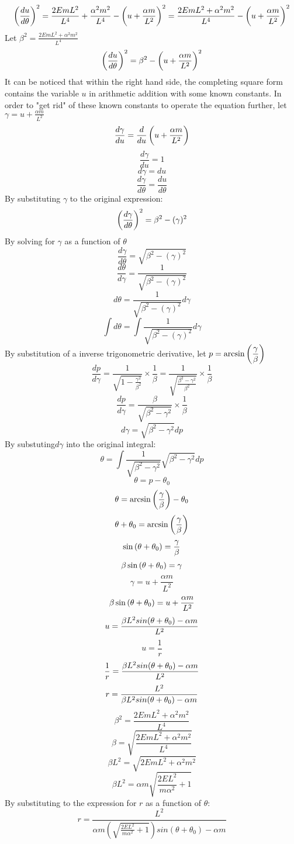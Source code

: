 \documentclass[a4paper, 12pt]{report}
\begin{document}
\begin{center}
$$\left(\frac{du}{d\theta}\right)^2=\frac{2EmL^2}{L^4}+ \frac{\alpha^2 m^2}{L^4}-\left(u+\frac{\alpha m}{L^2}\right)^2 = \frac{2EmL^2+\alpha^2 m^2}{L^4}-\left(u+\frac{\alpha m}{L^2}\right)^2$$
Let $\displaystyle \beta^2 = \frac{2EmL^2+\alpha^2 m^2}{L^4}$
$$\left(\frac{du}{d\theta}\right)^2=\beta^2-\left(u+\frac{\alpha m}{L^2}\right)^2$$
It can be noticed that within the right hand side, the completing square form contains the variable $u$ in arithmetic addition with some known constants. In order to "get rid" of these known constants to operate the equation further, let $\displaystyle \gamma = u +\frac{\alpha m}{L^2}$
$$\frac{d\gamma}{du} = \frac{d}{du}\left(u+\frac{\alpha m}{L^2}\right)$$
$$\frac{d\gamma}{du} = 1$$
$$d\gamma = du$$
$$\frac{d\gamma}{d\theta}=\frac{du}{d\theta}$$
By substituting $\gamma$ to the original expression:
$$\left(\frac{d\gamma}{d\theta}\right)^2 = \beta^2-(\gamma)^2$$
By solving for $\gamma$ as a function of $\theta$
$$\frac{d\gamma}{d\theta} = \sqrt{\beta^2-(\gamma)^2}$$
$$\frac{d\theta}{d\gamma} = \frac{1}{\sqrt{\beta^2-(\gamma)^2}}$$
$$d\theta= \frac{1}{\sqrt{\beta^2-(\gamma)^2}}d\gamma$$
$$\int{d\theta} = \int{\frac{1}{\sqrt{\beta^2-(\gamma)^2}}d\gamma}$$
By substitution of a inverse trigonometric derivative, let $\displaystyle p = \arcsin\left(\frac{\gamma}{\beta}\right)$
$$\frac{dp}{d\gamma} = \frac{1}{\sqrt{1-\frac{\gamma^2}{\beta^2}}}\times\frac{1}{\beta} = \frac{1}{\sqrt{\frac{\beta^2-\gamma^2}{\beta^2}}}\times\frac{1}\beta$$
$$\frac{dp}{d\gamma}=\frac{\beta}{\sqrt{\beta^2-\gamma^2}}\times\frac{1}{\beta}$$
$$d\gamma=\sqrt{\beta^2-\gamma^2}dp$$
By substuting$d\gamma$ into the original integral:
$$\theta = \int{\frac{1}{\sqrt{\beta^2-\gamma^2}}\sqrt{\beta^2-\gamma^2}dp}$$
$$\theta = p - \theta_0$$
$$\theta = \arcsin{\left(\frac{\gamma}{\beta}\right)}-\theta_0$$
$$\theta + \theta_0 = \arcsin{\left(\frac{\gamma}{\beta}\right)}$$
$$\sin{\left(\theta+\theta_0\right)} = \frac{\gamma}{\beta}$$
$$\beta\sin{\left(\theta+\theta_0\right)} =\gamma$$
$$\gamma = u + \frac{\alpha m}{L^2}$$
$$\beta\sin{\left(\theta+\theta_0\right)} =u + \frac{\alpha m}{L^2}$$
$$u = \frac{\beta L^2sin{\left(\theta+ \theta_0\right)}-\alpha m}{L^2}$$
$$u = \frac{1}{r}$$
$$\frac{1}{r}=\frac{\beta L^2sin{\left(\theta+ \theta_0\right)}-\alpha m}{L^2}$$
$$r = \frac{L^2}{\beta L^2sin{\left(\theta+ \theta_0\right)}-\alpha m}$$
$$\beta^2 = \frac{2EmL^2+\alpha^2 m^2}{L^4}$$
$$\beta = \sqrt{\frac{2EmL^2+\alpha^2 m^2}{L^4}}$$
$$\beta L^2 =\sqrt{2EmL^2+\alpha^2 m^2} $$
$$\beta L^2 =\alpha m\sqrt{\frac{2EL^2}{m\alpha^2}+1}$$
By substituting to the expression for $r$ as a function of $\theta$:
$$r = \frac{L^2}{\alpha m(\sqrt{\frac{2EL^2}{m\alpha^2}+1})sin{(\theta+ \theta_0)}-\alpha m}$$

\end{center}
\end{document}
